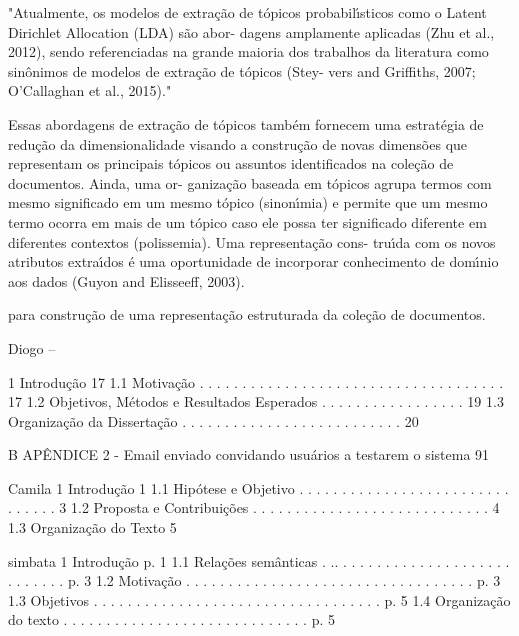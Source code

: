"Atualmente, os modelos de extração de tópicos probabilı́sticos como o Latent Dirichlet Allocation (LDA) são abor- dagens amplamente aplicadas (Zhu et al., 2012), sendo referenciadas na grande maioria dos trabalhos da literatura como sinônimos de modelos de extração de tópicos (Stey- vers and Griffiths, 2007; O’Callaghan et al., 2015)."  


Essas abordagens de extração de tópicos também fornecem uma estratégia
de redução da dimensionalidade visando a construção de novas dimensões que representam
os principais tópicos ou assuntos identificados na coleção de documentos. Ainda, uma or-
ganização baseada em tópicos agrupa termos com mesmo significado em um mesmo tópico
(sinonı́mia) e permite que um mesmo termo ocorra em mais de um tópico caso ele possa
ter significado diferente em diferentes contextos (polissemia). Uma representação cons-
truı́da com os novos atributos extraı́dos é uma oportunidade de incorporar conhecimento
de domı́nio aos dados (Guyon and Elisseeff, 2003).


para construção de uma representação estruturada da coleção de documentos.





























Diogo --

1 Introdução
17
1.1 Motivação . . . . . . . . . . . . . . . . . . . . . . . . . . . . . . . . . . . . 17
1.2 Objetivos, Métodos e Resultados Esperados . . . . . . . . . . . . . . . . . 19
1.3 Organização da Dissertação . . . . . . . . . . . . . . . . . . . . . . . . . . 20

B APÊNDICE 2 - Email enviado convidando usuários a testarem o sistema 91



Camila
1 Introdução
1
1.1 Hipótese e Objetivo . . . . . . . . . . . . . . . . . . . . . . . . . . . . . . . 3
1.2 Proposta e Contribuições . . . . . . . . . . . . . . . . . . . . . . . . . . . . 4
1.3 Organização do Texto 5


simbata
1
Introdução p. 1
1.1 Relações semânticas . .. . . . . . . . . . . . . . . . . . . . . . . . . . . . p. 3
1.2 Motivação . . . . . . .  . . . . . . . . . . . . . . . . . . . . . . . . . . . p. 3
1.3 Objetivos . . . . . . .  . . . . . . . . . . . . . . . . . . . . . . . . . . . p. 5
1.4 Organização do texto . . . . . . . . . . . . . . . . . . . . . . . . . . . . . p. 5





